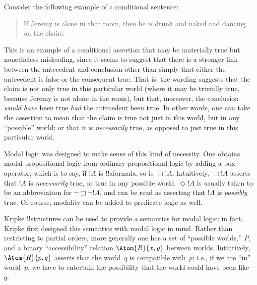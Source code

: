 \documentclass[../../../include/open-logic-section]{subfiles}
\begin{document}


Consider the following example of a conditional sentence:
\begin{quote}
  If Jeremy is alone in that room, then he is drunk and naked and
  dancing on the chairs.
\end{quote}
This is an example of a conditional assertion that may be materially
true but nonetheless misleading, since it seems to suggest that there
is a stronger link between the antecedent and conclusion other than
simply that either the antecedent is false or the consequent
true. That is, the wording suggests that the claim is not only true in
this particular world (where it may be trivially true, because Jeremy
is not alone in the room), but that, moreover, the conclusion
\emph{would have} been true \emph{had} the antecedent been true. In
other words, one can take the assertion to mean that the claim is true
not just in this world, but in any ``possible'' world; or that it is
\emph{necessarily} true, as opposed to just true in this particular
world.

Modal logic was designed to make sense of this kind of necessity. One
obtains modal propositional logic from ordinary
propositional logic by adding a box operator; which is to say, if
$!A$ is !!a{formula}, so is $\Box !A$.  Intuitively, $\Box !A$
asserts that $!A$ is \emph{necessarily} true, or true in any possible
world. $\Diamond !A$ is usually taken to be an abbreviation for
$\lnot \Box \lnot !A$, and can be read as asserting that $!A$ is
\emph{possibly} true. Of course, modality can be added to predicate
logic as well.

Kripke !!{structure}s can be used to provide a semantics for modal
logic; in fact, Kripke first designed this semantics with modal logic
in mind. Rather than restricting to partial orders, more generally one
has a set of ``possible worlds,'' $P$, and a binary ``accessibility''
relation $\Atom{R}{x,y}$ between worlds. Intuitively, $\Atom{R}{p,q}$
asserts that the world~$q$ is compatible with~$p$; i.e., if we are
``in'' world~$p$, we have to entertain the possibility that the
world could have been like~$q$.
\end{document}
